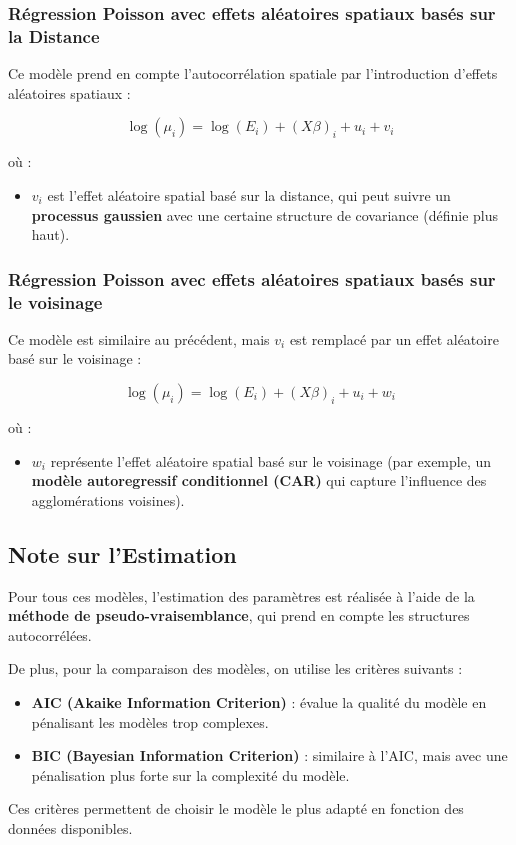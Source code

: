 \documentclass[
]{article}
\providecommand{\tightlist}{%
  \setlength{\itemsep}{0pt}\setlength{\parskip}{0pt}}
\begin{document}
\subsubsection{Régression Poisson avec effets aléatoires spatiaux basés
sur la
Distance}\label{ruxe9gression-poisson-avec-effets-aluxe9atoires-spatiaux-basuxe9s-sur-la-distance}

Ce modèle prend en compte l'autocorrélation spatiale par l'introduction
d'effets aléatoires spatiaux :

\[
\log(\mu_i) = \log(E_i) + (X\beta)_i + u_i + v_i
\]

où :

\begin{itemize}
\tightlist
\item
  \(v_i\) est l'effet aléatoire spatial basé sur la distance, qui peut
  suivre un \textbf{processus gaussien} avec une certaine structure de
  covariance (définie plus haut).
\end{itemize}

\subsubsection{Régression Poisson avec effets aléatoires spatiaux basés
sur le
voisinage}\label{ruxe9gression-poisson-avec-effets-aluxe9atoires-spatiaux-basuxe9s-sur-le-voisinage}

Ce modèle est similaire au précédent, mais \(v_i\) est remplacé par un
effet aléatoire basé sur le voisinage :

\[
\log(\mu_i) = \log(E_i) + (X\beta)_i + u_i + w_i
\]

où :

\begin{itemize}
\tightlist
\item
  \(w_i\) représente l'effet aléatoire spatial basé sur le voisinage
  (par exemple, un \textbf{modèle autoregressif conditionnel (CAR)} qui
  capture l'influence des agglomérations voisines).
\end{itemize}

\subsection{Note sur l'Estimation}\label{note-sur-lestimation}

Pour tous ces modèles, l'estimation des paramètres est réalisée à l'aide
de la \textbf{méthode de pseudo-vraisemblance}, qui prend en compte les
structures autocorrélées.

De plus, pour la comparaison des modèles, on utilise les critères
suivants :

\begin{itemize}
\tightlist
\item
  \textbf{AIC (Akaike Information Criterion)} : évalue la qualité du
  modèle en pénalisant les modèles trop complexes.
\item
  \textbf{BIC (Bayesian Information Criterion)} : similaire à l'AIC,
  mais avec une pénalisation plus forte sur la complexité du modèle.
\end{itemize}

Ces critères permettent de choisir le modèle le plus adapté en fonction
des données disponibles.
\end{document}
